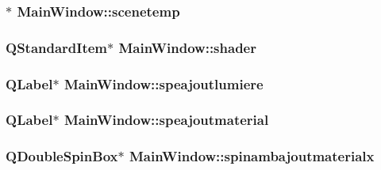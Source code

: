 \hypertarget{class_main_window_ab3b59f5d30eaedb1281da2b817c17fdf}{
\subsubsection[{scenetemp}]{$\ast$ Main\+Window\+::scenetemp\hspace{0.3cm}{\ttfamily [private]}}}\label{class_main_window_ab3b59f5d30eaedb1281da2b817c17fdf}
\hypertarget{class_main_window_a8e49ee04eabb719ac4be13ba8cd3fe38}{
\subsubsection[{shader}]{\setlength{\rightskip}{0pt plus 5cm}Q\+Standard\+Item$\ast$ Main\+Window\+::shader\hspace{0.3cm}{\ttfamily [private]}}}\label{class_main_window_a8e49ee04eabb719ac4be13ba8cd3fe38}
\hypertarget{class_main_window_a549c42dd7554a4414ca34fc253457889}{
\subsubsection[{speajoutlumiere}]{\setlength{\rightskip}{0pt plus 5cm}Q\+Label$\ast$ Main\+Window\+::speajoutlumiere\hspace{0.3cm}{\ttfamily [private]}}}\label{class_main_window_a549c42dd7554a4414ca34fc253457889}
\hypertarget{class_main_window_a464561ddbc54d9ced72ad2e1bd76c582}{
\subsubsection[{speajoutmaterial}]{\setlength{\rightskip}{0pt plus 5cm}Q\+Label$\ast$ Main\+Window\+::speajoutmaterial\hspace{0.3cm}{\ttfamily [private]}}}\label{class_main_window_a464561ddbc54d9ced72ad2e1bd76c582}
\hypertarget{class_main_window_a307a29066af1090776251ddc1e067388}{
\subsubsection[{spinambajoutmaterialx}]{\setlength{\rightskip}{0pt plus 5cm}Q\+Double\+Spin\+Box$\ast$ Main\+Window\+::spinambajoutmaterialx\hspace{0.3cm}{\ttfamily [private]}}}\label{class_main_window_a307a29066af1090776251ddc1e067388}
